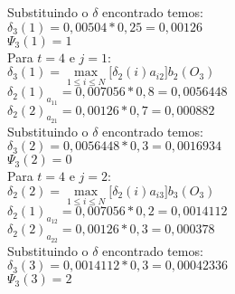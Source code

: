 \begin{multicols}{2}
Substituindo o $\delta$ encontrado temos:\\
$\delta_3(1) = 0,00504 * 0,25 = 0,00126$\\ 
 $\Psi_3(1) = 1$\\

Para $t=4$ e $j = 1$:\\
$\displaystyle \delta_3 (1) = \max\limits_{1 \leq i \leq N} \Big[\delta_{2}(i) a_{i2} \Big]b_2 (O_3)$\\
$\delta_2(1)_{a_{11}} = 0,007056 * 0,8 = 0,0056448$\\
$\delta_2(2)_{a_{21}} = 0,00126 * 0,7 = 0,000882$\\
 
Substituindo o $\delta$ encontrado temos:\\
 $\delta_3(2) = 0,0056448 * 0,3 = 0,0016934$\\
$\Psi_3(2) = 0$\\

Para $t=4$ e $j = 2$:\\
$\displaystyle \delta_2 (2) = \max\limits_{1 \leq i \leq N} \Big[\delta_{2}(i) a_{i3} \Big]b_3 (O_3)$\\
$\delta_2(1)_{a_{12}} = 0,007056 * 0,2 = 0,0014112$\\
$\delta_2(2)_{a_{22}} = 0,00126 * 0,3 = 0,000378$\\ 


 Substituindo o $\delta$ encontrado temos:\\
$\delta_3(3) = 0,0014112 * 0,3 = 0,00042336$\\
$\Psi_3(3) = 2$\\

\end{multicols}
